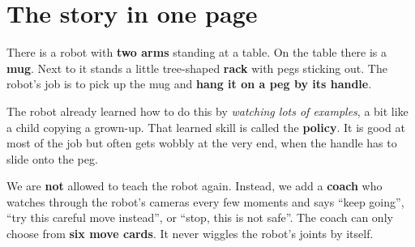 \documentclass[11pt,a4paper]{article}
\begin{document}
\section{The story in one page}

\begin{eli5}
There is a robot with \textbf{two arms} standing at a table. On the table there is a \textbf{mug}.
Next to it stands a little tree-shaped \textbf{rack} with pegs sticking out. The robot's job is to
pick up the mug and \textbf{hang it on a peg by its handle}.

The robot already learned how to do this by \emph{watching lots of examples}, a bit like a child
copying a grown-up. That learned skill is called the \textbf{policy}. It is good at most of the
job but often gets wobbly at the very end, when the handle has to slide onto the peg.

We are \textbf{not} allowed to teach the robot again. Instead, we add a \textbf{coach} who watches
through the robot's cameras every few moments and says ``keep going'', ``try this careful move
instead'', or ``stop, this is not safe''. The coach can only choose from \textbf{six move cards}.
It never wiggles the robot's joints by itself.
\end{eli5}
\end{document}
